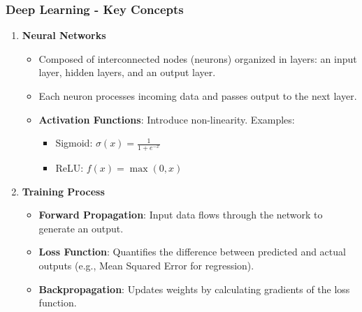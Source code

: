 \documentclass[aspectratio=169]{beamer}
\begin{document}
\begin{frame}[fragile]
    \frametitle{Deep Learning - Key Concepts}
    \begin{enumerate}
        \item \textbf{Neural Networks}
            \begin{itemize}
                \item Composed of interconnected nodes (neurons) organized in layers: an input layer, hidden layers, and an output layer.
                \item Each neuron processes incoming data and passes output to the next layer.
                \item \textbf{Activation Functions}: Introduce non-linearity. Examples:
                    \begin{itemize}
                        \item Sigmoid: $\sigma(x) = \frac{1}{1 + e^{-x}}$
                        \item ReLU: $f(x) = \max(0, x)$
                    \end{itemize}
            \end{itemize}
            
        \item \textbf{Training Process}
            \begin{itemize}
                \item \textbf{Forward Propagation}: Input data flows through the network to generate an output.
                \item \textbf{Loss Function}: Quantifies the difference between predicted and actual outputs (e.g., Mean Squared Error for regression).
                \item \textbf{Backpropagation}: Updates weights by calculating gradients of the loss function.
            \end{itemize}
    \end{enumerate}
\end{frame}
\end{document}
